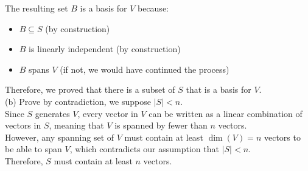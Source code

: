 \documentclass{article}
\begin{document}
The resulting set $B$ is a basis for $V$ because:
\begin{itemize}
    \item $B \subseteq S$ (by construction)
    \item $B$ is linearly independent (by construction)
    \item $B$ spans $V$ (if not, we would have continued the process)
\end{itemize}

Therefore, we proved that there is a subset of $S$ that is a basis for $V$. \\

(b) Prove by contradiction, we suppose $|S| < n$. \\

Since $S$ generates $V$, every vector in $V$ can be written as a linear combination of vectors in $S$, meaning that $V$ is spanned by fewer than $n$ vectors. \\

However, any spanning set of $V$ must contain at least $\dim(V) = n$ vectors to be able to span $V$, which contradicts our assumption that $|S| < n$. \\

Therefore, $S$ must contain at least $n$ vectors. 
\end{document}
